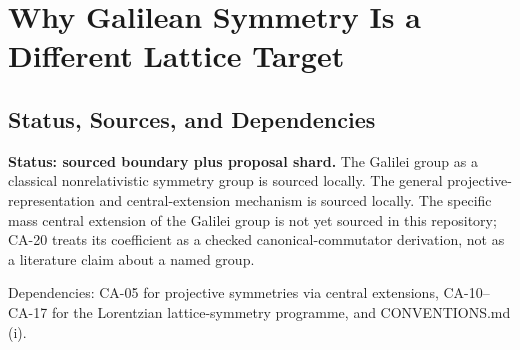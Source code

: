 
\section{Why Galilean Symmetry Is a Different Lattice Target}
\label{sec:galilean-symmetry-motivation}

\subsection{Status, Sources, and Dependencies}

\textbf{Status: sourced boundary plus proposal shard.}  The Galilei group as a
classical nonrelativistic symmetry group is sourced locally.  The general
projective-representation and central-extension mechanism is sourced locally.
The specific mass central extension of the Galilei group is not yet sourced in
this repository; CA-20 treats its coefficient as a checked canonical-commutator
derivation, not as a literature claim about a named group.

Dependencies: CA-05 for projective symmetries via central extensions, CA-10--CA-17
for the Lorentzian lattice-symmetry programme, and CONVENTIONS.md (i).


